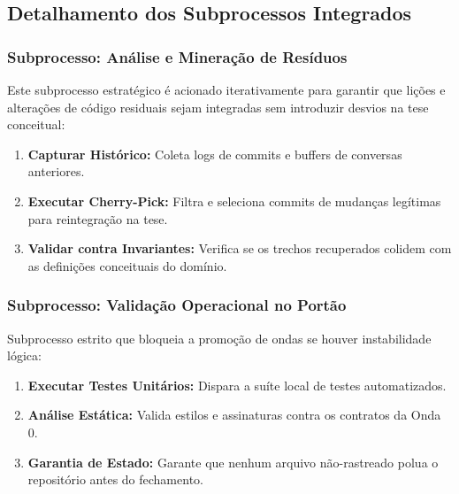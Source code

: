 \subsection{Detalhamento dos Subprocessos Integrados}

\subsubsection{Subprocesso: Análise e Mineração de Resíduos}
Este subprocesso estratégico é acionado iterativamente para garantir que lições e alterações de código residuais sejam integradas sem introduzir desvios na tese conceitual:
\begin{enumerate}
    \item \textbf{Capturar Histórico:} Coleta logs de commits e buffers de conversas anteriores.
    \item \textbf{Executar Cherry-Pick:} Filtra e seleciona commits de mudanças legítimas para reintegração na tese.
    \item \textbf{Validar contra Invariantes:} Verifica se os trechos recuperados colidem com as definições conceituais do domínio.
\end{enumerate}

\subsubsection{Subprocesso: Validação Operacional no Portão}
Subprocesso estrito que bloqueia a promoção de ondas se houver instabilidade lógica:
\begin{enumerate}
    \item \textbf{Executar Testes Unitários:} Dispara a suíte local de testes automatizados.
    \item \textbf{Análise Estática:} Valida estilos e assinaturas contra os contratos da Onda 0.
    \item \textbf{Garantia de Estado:} Garante que nenhum arquivo não-rastreado polua o repositório antes do fechamento.
\end{enumerate}
